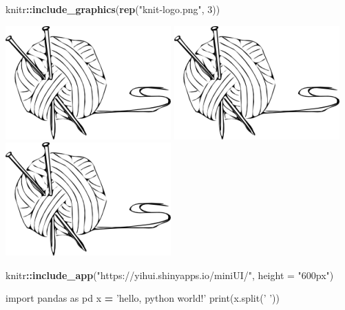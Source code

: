 \documentclass[]{book}
\newenvironment{Shaded}{\begin{snugshade}}{\end{snugshade}}
\newcommand{\KeywordTok}[1]{\textcolor[rgb]{0.13,0.29,0.53}{\textbf{#1}}}
\newcommand{\DataTypeTok}[1]{\textcolor[rgb]{0.13,0.29,0.53}{#1}}
\newcommand{\DecValTok}[1]{\textcolor[rgb]{0.00,0.00,0.81}{#1}}
\newcommand{\StringTok}[1]{\textcolor[rgb]{0.31,0.60,0.02}{#1}}
\newcommand{\ImportTok}[1]{#1}
\newcommand{\OperatorTok}[1]{\textcolor[rgb]{0.81,0.36,0.00}{\textbf{#1}}}
\newcommand{\BuiltInTok}[1]{#1}
\newcommand{\NormalTok}[1]{#1}
\begin{document}
\begin{Shaded}
\begin{Highlighting}[]
\NormalTok{knitr}\OperatorTok{::}\KeywordTok{include_graphics}\NormalTok{(}\KeywordTok{rep}\NormalTok{(}\StringTok{"knit-logo.png"}\NormalTok{, }\DecValTok{3}\NormalTok{))}
\end{Highlighting}
\end{Shaded}

\includegraphics{knit-logo.png} \includegraphics{knit-logo.png}
\includegraphics{knit-logo.png}

\begin{Shaded}
\begin{Highlighting}[]
\NormalTok{knitr}\OperatorTok{::}\KeywordTok{include_app}\NormalTok{(}\StringTok{"https://yihui.shinyapps.io/miniUI/"}\NormalTok{, }
                     \DataTypeTok{height =} \StringTok{"600px"}\NormalTok{)}
\end{Highlighting}
\end{Shaded}

\begin{Shaded}
\begin{Highlighting}[]
\ImportTok{import}\NormalTok{ pandas }\ImportTok{as}\NormalTok{ pd}
\NormalTok{x }\OperatorTok{=} \StringTok{'hello, python world!'}
\BuiltInTok{print}\NormalTok{(x.split(}\StringTok{' '}\NormalTok{))}
\end{Highlighting}
\end{Shaded}
\end{document}
